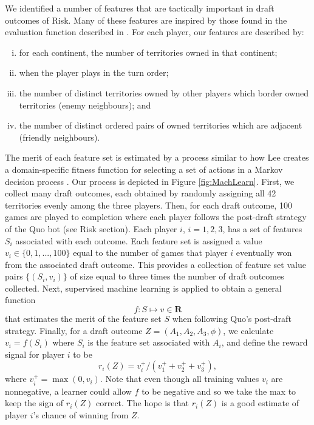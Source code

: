 \documentclass[letterpaper]{article}
\numberwithin{equation}{section}
\numberwithin{theorem}{section}
\numberwithin{lemma}{section}
\numberwithin{df}{section}
\begin{document}
We identified a number of features that are tactically important in draft outcomes of Risk.  Many of these features are inspired by those found in the evaluation function described in \cite{RiskBots}.  For each player, our features are described by:
\begin{enumerate}[(i)] %
	\item for each continent, the number of territories owned in that continent;
	\item when the player plays in the turn order;
	\item the number of distinct territories owned by other players which border owned territories (enemy neighbours); and
	\item the number of distinct ordered pairs of owned territories which are adjacent (friendly neighbours).
\end{enumerate}
The merit of each feature set is estimated by a process similar to how Lee creates a domain-specific fitness function for selecting a set of actions in a Markov decision process \cite{GregLeeThesis}.  Our process is depicted in Figure \ref{fig:MachLearn}.  First, we collect many draft outcomes, each obtained by randomly assigning all 42 territories evenly among the three players.  Then, for each draft outcome, 100 games are played to completion where each player follows the post-draft strategy of the Quo bot (see Risk section).  Each player $i$, $i=1,2,3$, has a set of features $S_i$ associated with each outcome.  Each feature set is assigned a value $v_i \in \{0,1,...,100\}$ equal to the number of games that player $i$ eventually won from the associated draft outcome.  This provides a collection of feature set value pairs $\{(S_i, v_i)\}$ of size equal to three times the number of draft outcomes collected.  Next, supervised machine learning is applied to obtain a general function
\[ f: S \mapsto v \in \textbf{R} \] 
that estimates the merit of the feature set $S$ when following Quo's post-draft strategy.  Finally, for a draft outcome $Z = (A_1,A_2,A_3,\phi)$, we calculate $v_i = f(S_i)$ where $S_i$ is the feature set associated with $A_i$, and define the reward signal for player $i$ to be
\[ r_i(Z) = v_i^+ / \left(v_1^+ + v_2^+ + v_3^+\right), \]
where $v_i^+ = \max(0, v_i)$.  Note that even though all training values $v_i$ are nonnegative, a learner could allow $f$ to be negative and so we take the max to keep the sign of $r_i(Z)$ correct.  The hope is that $r_i(Z)$ is a good estimate of player $i$'s chance of winning from $Z$.
\end{document}
